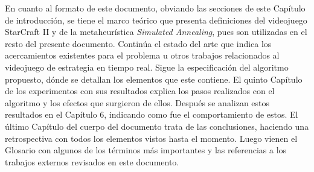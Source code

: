 En cuanto al formato de este documento, obviando las secciones de este Capítulo de introducción, se tiene el marco teórico que presenta definiciones del videojuego StarCraft II y de la metaheurística \textit{Simulated Annealing}, pues son utilizadas en el resto del presente documento. Continúa el estado del arte que indica los acercamientos existentes para el problema u otros trabajos relacionados al videojuego de estrategia en tiempo real. Sigue la especificación del algoritmo propuesto, dónde se detallan los elementos que este contiene. El quinto Capítulo de los experimentos con sus resultados explica los pasos realizados con el algoritmo y los efectos que surgieron de ellos. Después se analizan estos resultados en el Capítulo 6, indicando como fue el comportamiento de estos. El último Capítulo del cuerpo del documento trata de las conclusiones, haciendo una retrospectiva con todos los elementos vistos hasta el momento. Luego vienen el Glosario con algunos de los términos más importantes y las referencias a los trabajos externos revisados en este documento.